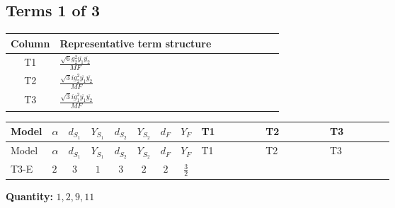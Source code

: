 \documentclass[8pt]{article}
\begin{document}
\begin{landscape}
\subsection*{Terms 1 of 3}
\begin{center}
\begin{tabular}{@{}c >{\raggedright\arraybackslash}p{0.82\linewidth}@{}}
\toprule
Column & Representative term structure \\
\midrule
T1 & \(\displaystyle \frac{\sqrt{6} g_{2}^{2} \overline{y_{1}} \overline{y_{2}}}{MF}\) \\
\midrule
T2 & \(\displaystyle \frac{\sqrt{3} i g_{2}^{2} \overline{y_{1}} \overline{y_{2}}}{MF}\) \\
\midrule
T3 & \(\displaystyle \frac{\sqrt{3} i g_{1}^{2} \overline{y_{1}} \overline{y_{2}}}{MF}\) \\
\midrule
\bottomrule
\end{tabular}
\end{center}
\smallskip
\tiny
\begin{longtable}{@{}llcccccc >{\raggedright\arraybackslash}p{0.21\linewidth} >{\raggedright\arraybackslash}p{0.21\linewidth} >{\raggedright\arraybackslash}p{0.21\linewidth}@{}}
\toprule
Model & $\alpha$ & $d_{S_1}$ & $Y_{S_1}$ & $d_{S_2}$ & $Y_{S_2}$ & $d_F$ & $Y_F$ & T1 & T2 & T3 \\
\midrule
\endfirsthead
\toprule
Model & $\alpha$ & $d_{S_1}$ & $Y_{S_1}$ & $d_{S_2}$ & $Y_{S_2}$ & $d_F$ & $Y_F$ & T1 & T2 & T3 \\
\midrule
\endhead
T3-E & $2$ & $3$ & $1$ & $3$ & $2$ & $2$ & $\frac{3}{2}$ & \scriptsize\adjustbox{max width=\linewidth}{$\begin{gathered} - \frac{\sqrt{6} g_{2}^{2} \overline{y_{1}} \overline{y_{2}}}{6 MF}\end{gathered}$} & \scriptsize\adjustbox{max width=\linewidth}{$\begin{gathered} - \frac{15 \sqrt{3} i g_{2}^{2} \overline{y_{1}} \overline{y_{2}}}{8 MF}\end{gathered}$} & \scriptsize\adjustbox{max width=\linewidth}{$\begin{gathered} - \frac{9 \sqrt{3} i g_{1}^{2} \overline{y_{1}} \overline{y_{2}}}{8 MF}\end{gathered}$} \\
\midrule
\bottomrule
\end{longtable}
\clearpage
\noindent\textbf{Quantity: }$\mathrm{1,2,9,11}$\par\smallskip

\end{landscape}
\end{document}
